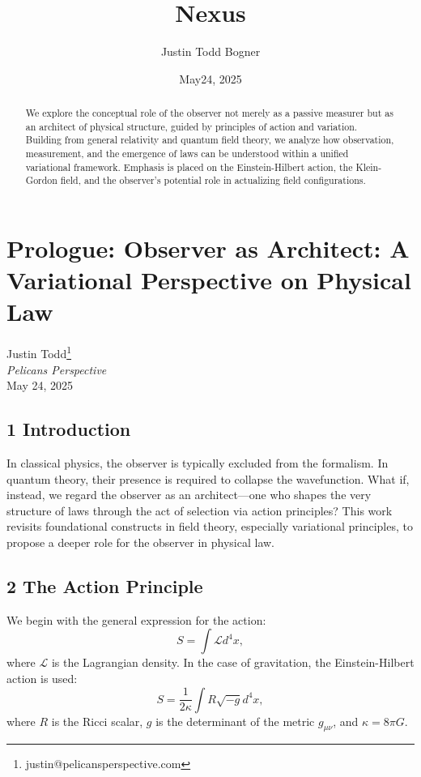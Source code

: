 \documentclass[11pt, a4paper]{book}
\title{Nexus}
\author{Justin Todd Bogner}
\date{May24, 2025} %
\begin{document}
\maketitle
\frontmatter
\tableofcontents

\chapter*{Prologue: Observer as Architect: A Variational Perspective on Physical Law}
\label{chap:observerasarchitect}
\begin{center}
Justin Todd\footnote{justin@pelicansperspective.com} \\
\textit{Pelicans Perspective} \\
May 24, 2025 %
\end{center}

\begin{abstract}
\noindent We explore the conceptual role of the observer not merely as a passive measurer but as an architect of physical structure, guided by principles of action and variation. Building from general relativity and quantum field theory, we analyze how observation, measurement, and the emergence of laws can be understood within a unified variational framework. Emphasis is placed on the Einstein-Hilbert action, the Klein-Gordon field, and the observer’s potential role in actualizing field configurations.
\end{abstract}

\section*{1 Introduction} %
In classical physics, the observer is typically excluded from the formalism. In quantum theory, their presence is required to collapse the wavefunction. What if, instead, we regard the observer as an architect—one who shapes the very structure of laws through the act of selection via action principles?
This work revisits foundational constructs in field theory, especially variational principles, to propose a deeper role for the observer in physical law.

\section*{2 The Action Principle}
We begin with the general expression for the action:
\begin{equation} \label{eq:action_general}
S = \int \mathcal{L} d^4x,
\end{equation}
where $\mathcal{L}$ is the Lagrangian density.
In the case of gravitation, the Einstein-Hilbert action is used:
\begin{equation} \label{eq:action_eh}
S = \frac{1}{2\kappa} \int R\sqrt{-g} d^4x,
\end{equation}
where $R$ is the Ricci scalar, $g$ is the determinant of the metric $g_{\mu\nu}$, and $\kappa = 8\pi G$.
\end{document}
